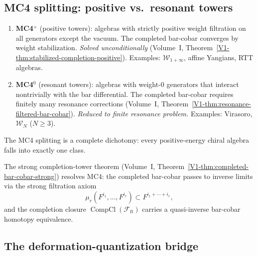 \subsection{MC4 splitting: positive vs.\ resonant towers}

\begin{definition}[MC4$^+$ and MC4$^0$]
\begin{enumerate}[label=\textup{(\roman*)}]
\item \textbf{MC4$^+$} (positive towers): algebras with strictly
 positive weight filtration on all generators except the vacuum.
 The completed bar-cobar converges by weight stabilization.
 \emph{Solved unconditionally}
 (Volume~I, Theorem~\ref{V1-thm:stabilized-completion-positive}).
 Examples: $\mathcal{W}_{1+\infty}$, affine Yangians, RTT algebras.
\item \textbf{MC4$^0$} (resonant towers): algebras with weight-$0$
 generators that interact nontrivially with the bar differential.
 The completed bar-cobar requires finitely many resonance corrections
 (Volume~I, Theorem~\ref{V1-thm:resonance-filtered-bar-cobar}).
 \emph{Reduced to finite resonance problem.}
 Examples: Virasoro, $\mathcal{W}_N$ ($N \ge 3$).
\end{enumerate}
The MC4 splitting is a complete dichotomy: every positive-energy
chiral algebra falls into exactly one class.
\end{definition}

\begin{theorem}
The strong completion-tower theorem
(Volume~I, Theorem~\ref{V1-thm:completed-bar-cobar-strong}) resolves
MC4: the completed bar-cobar passes to inverse limits via the
strong filtration axiom
\begin{equation}%
\mu_r(F^{i_1}, \ldots, F^{i_r}) \subset F^{i_1 + \cdots + i_r},
\end{equation}
and the completion closure $\operatorname{CompCl}(\mathcal{F}_{\mathrm{ft}})$
carries a quasi-inverse bar-cobar homotopy equivalence.
\end{theorem}


\subsection{The deformation-quantization bridge}

